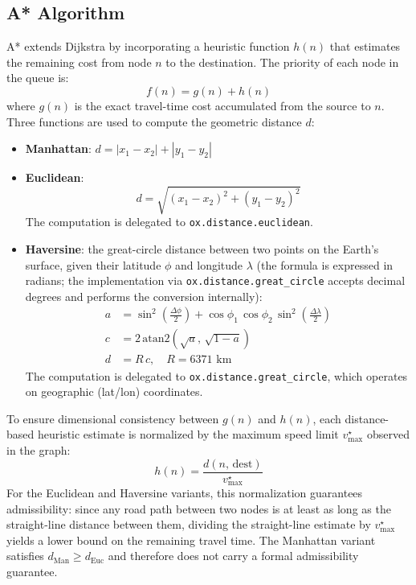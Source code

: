 \documentclass[12pt,a4paper]{article}
\begin{document}
\subsection{A* Algorithm}
\label{sec:astar_design}

A* extends Dijkstra by incorporating a heuristic function $h(n)$ that estimates the remaining cost from node $n$ to the destination.
The priority of each node in the queue is:
\[
  f(n) = g(n) + h(n)
\]
where $g(n)$ is the exact travel-time cost accumulated from the source to $n$.
Three functions are used to compute the geometric distance $d$:

\begin{itemize}
  \item \textbf{Manhattan}: $d = |x_1 - x_2| + |y_1 - y_2|$

  \item \textbf{Euclidean}:
  \[
    d = \sqrt{(x_1 - x_2)^2 + (y_1 - y_2)^2}
  \]
  The computation is delegated to \texttt{ox.distance.euclidean}.

  \item \textbf{Haversine}: the great-circle distance between two points on the Earth's surface,
  given their latitude $\phi$ and longitude $\lambda$ (the formula is expressed in radians; the implementation via \texttt{ox.distance.great\_circle} accepts decimal degrees and performs the conversion internally):
  \begin{align*}
    a &= \sin^2\!\left(\frac{\Delta\phi}{2}\right)
       + \cos\phi_1\,\cos\phi_2\,\sin^2\!\left(\frac{\Delta\lambda}{2}\right) \\
    c &= 2\,\mathrm{atan2}\!\left(\sqrt{a},\,\sqrt{1-a}\right) \\
    d &= R\,c, \quad R = 6371\text{ km}
  \end{align*}
  The computation is delegated to \texttt{ox.distance.great\_circle}, which operates on geographic (lat/lon) coordinates.
\end{itemize}

To ensure dimensional consistency between $g(n)$ and $h(n)$, each distance-based heuristic estimate is normalized by the maximum speed limit $v_{\max}^{\star}$ observed in the graph:
\[
  h(n) = \frac{d(n,\, \text{dest})}{v_{\max}^{\star}}
\]
For the Euclidean and Haversine variants, this normalization guarantees admissibility: since any road path between two nodes is at least as long as the straight-line distance between them, dividing the straight-line estimate by $v_{\max}^{\star}$ yields a lower bound on the remaining travel time.
The Manhattan variant satisfies $d_{\text{Man}} \geq d_{\text{Euc}}$ and therefore does not carry a formal admissibility guarantee.
\end{document}
